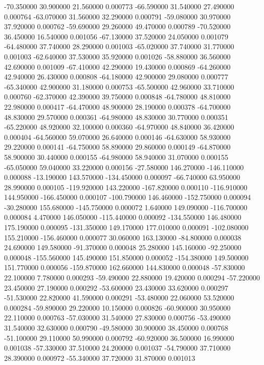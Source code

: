 -70.350000 30.900000 21.560000 0.000773 
-66.590000 31.540000 27.490000 0.000764 
-63.070000 31.560000 32.290000 0.000791 
-59.080000 30.970000 37.920000 0.000762 
-59.690000 29.260000 49.470000 0.000789 
-70.520000 36.450000 16.540000 0.001056 
-67.130000 37.520000 24.050000 0.001079 
-64.480000 37.740000 28.290000 0.001003 
-65.020000 37.740000 31.770000 0.001003 
-62.640000 37.530000 35.920000 0.001026 
-58.880000 36.560000 42.690000 0.001009 
-67.410000 42.290000 19.430000 0.000869 
-64.260000 42.940000 26.430000 0.000808 
-64.180000 42.900000 29.080000 0.000777 
-65.340000 42.900000 31.180000 0.000753 
-65.500000 42.960000 33.710000 0.000760 
-62.370000 42.390000 39.750000 0.000848 
-64.780000 48.810000 22.980000 0.000417 
-64.470000 48.900000 28.190000 0.000378 
-64.700000 48.830000 29.570000 0.000361 
-64.980000 48.830000 30.770000 0.000351 
-65.220000 48.920000 32.100000 0.000360 
-64.970000 48.840000 36.420000 0.000404 
-64.560000 59.070000 26.640000 0.000146 
-64.630000 58.930000 29.220000 0.000141 
-64.750000 58.890000 29.860000 0.000149 
-64.870000 58.900000 30.440000 0.000155 
-64.980000 58.940000 31.070000 0.000155 
-65.050000 59.040000 33.220000 0.000156 
-27.580000 146.270000 -146.110000 0.000088 
-13.190000 143.570000 -134.450000 0.000097 
-66.740000 63.950000 28.990000 0.000105 
-119.920000 143.220000 -167.820000 0.000110 
-116.910000 144.950000 -166.450000 0.000107 
-100.790000 146.460000 -152.750000 0.000094 
-30.280000 155.680000 -145.750000 0.000072 
1.640000 149.090000 -116.700000 0.000084 
4.470000 146.050000 -115.440000 0.000092 
-134.550000 146.480000 175.190000 0.000095 
-131.350000 149.170000 177.010000 0.000091 
-102.080000 155.210000 -156.460000 0.000077 
30.060000 163.130000 -84.800000 0.000038 
24.690000 149.580000 -91.370000 0.000048 
25.280000 145.160000 -92.250000 0.000048 
-155.560000 145.490000 151.850000 0.000052 
-154.380000 149.500000 151.770000 0.000056 
-159.870000 162.660000 144.830000 0.000048 
-57.830000 22.100000 7.780000 0.000293 
-59.490000 22.880000 19.420000 0.000294 
-57.220000 23.450000 27.190000 0.000292 
-53.600000 23.430000 33.620000 0.000297 
-51.530000 22.820000 41.590000 0.000291 
-53.480000 22.060000 53.520000 0.000284 
-59.890000 29.220000 10.150000 0.000826 
-60.900000 30.950000 22.110000 0.000763 
-57.030000 31.540000 27.830000 0.000756 
-53.490000 31.540000 32.630000 0.000790 
-49.580000 30.900000 38.450000 0.000768 
-51.100000 29.110000 50.990000 0.000792 
-60.920000 36.500000 16.990000 0.001038 
-57.330000 37.510000 24.200000 0.001037 
-54.790000 37.710000 28.390000 0.000972 
-55.340000 37.720000 31.870000 0.001013 
